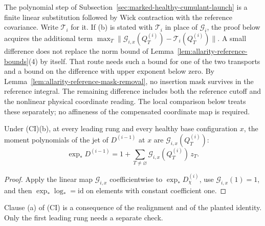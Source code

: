 The polynomial step of Subsection~\ref{sec:marked-healthy-cumulant-launch}
is a finite linear substitution followed by Wick contraction with the
reference covariance. Write $\mathcal T_i$ for it. If (b) is stated with
$\mathcal T_i$ in place of $\mathcal G_i$, the proof below acquires the
additional term $\max_T\|\mathcal G_{i,x}(Q^{(i)}_T)-\mathcal T_i(Q^{(i)}_T)\|$.
A small difference does not replace the norm bound of
Lemma~\ref{lem:allarity-reference-bounds}(4) by itself. That route needs
such a bound for one of the two transports and a bound on the
difference with upper exponent below zero. By
Lemma~\ref{lem:allarity-reference-mask-removal}, no insertion mask survives
in the reference integral. The remaining difference includes both the
reference cutoff and the nonlinear physical coordinate reading. The local
comparison below treats these separately; no affineness of the compensated
coordinate map is required.

\begin{lemma}
\label{lem:allarity-prescribed-reference}
Under (CI)(b), at every leading rung and every healthy base
configuration $x$, the moment polynomials of the jet of $D^{(i-1)}$ at $x$
are $\mathcal G_{i,x}(Q^{(i)}_T)$:
\[
 \exp_*D^{(i-1)}=1+\sum_{T\ne\varnothing}\mathcal G_{i,x}(Q^{(i)}_T)\,z_T .
\]
\end{lemma}
\begin{proof}
Apply the linear map $\mathcal G_{i,x}$ coefficientwise to
$\exp_*D^{(i)}_\chi$, use $\mathcal G_{i,x}(1)=1$, and then $\exp_*\log_*=\mathrm{id}$
on elements with constant coefficient one.
\end{proof}

Clause (a) of (CI) is a consequence of the realignment and of the planted
identity. Only the first leading rung needs a separate check.


